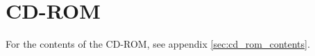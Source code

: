 \cleardoublepage
\section*{CD-ROM}
\label{sec:cd_rom}

For the contents of the CD-ROM, see appendix \ref{sec:cd_rom_contents}.

